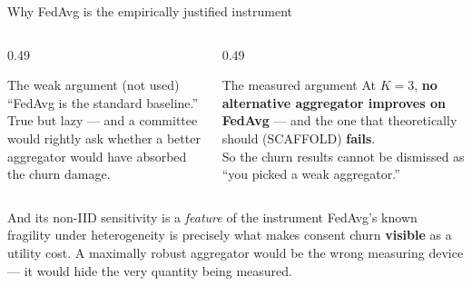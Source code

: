 \documentclass[aspectratio=169, 11pt]{beamer}
\begin{document}
\begin{frame}{Why FedAvg is the empirically justified instrument}
\begin{columns}[T]
\begin{column}{0.49\textwidth}
\begin{block}{The weak argument (not used)}
``FedAvg is the standard baseline.''\\[0.4em]
{\footnotesize True but lazy --- and a committee would rightly ask whether a
better aggregator would have absorbed the churn damage.}
\end{block}
\end{column}
\begin{column}{0.49\textwidth}
\begin{exampleblock}{The measured argument}
At $K{=}3$, \textbf{no alternative aggregator improves on FedAvg} --- and the
one that theoretically should (SCAFFOLD) \textbf{fails}.\\[0.4em]
So the churn results cannot be dismissed as ``you picked a weak aggregator.''
\end{exampleblock}
\end{column}
\end{columns}
\vspace{0.7em}
\begin{alertblock}{And its non-IID sensitivity is a \emph{feature} of the instrument}
FedAvg's known fragility under heterogeneity is precisely what makes consent
churn \textbf{visible} as a utility cost. A maximally robust aggregator would
be the wrong measuring device --- it would hide the very quantity being
measured.
\end{alertblock}
\end{frame}
\end{document}
